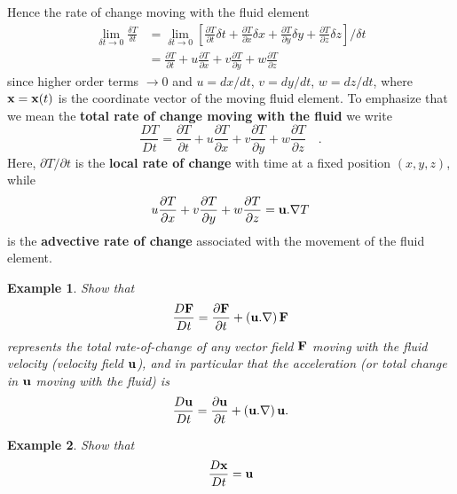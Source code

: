 \documentclass[twoside,a4paper,11pt]{report}
\newtheorem{exmp}{Example}}
\begin{document}
Hence the rate of change moving with the fluid element
\begin{align*}
\mathop {\lim }\limits_{\delta t\to 0} \frac{\delta T}{\delta 
t}
&=\mathop {\lim }\limits_{\delta t\to 0} \left[ {\frac{\partial 
T}{\partial t}\delta t+\frac{\partial T}{\partial x}\delta 
x+\frac{\partial T}{\partial y}\delta y+\frac{\partial 
T}{\partial z}\delta z} \right]/\delta t
\\
&
=\frac{\partial T}{\partial t}+u\frac{\partial T}{\partial 
x}+v\frac{\partial T}{\partial y}+w\frac{\partial 
T}{\partial z}
\end{align*}
since higher order terms $\to0$ and $u = dx/dt$, $v = dy/dt$, $w = dz/dt$, where 
${\bf x} = {\bf x}(t)$ is the coordinate vector of the 
moving fluid element. To emphasize that we mean the \textbf{total rate of 
change moving with the fluid} we write
\begin{equation}
\label{eq1}
\frac{DT}{Dt}=\frac{\partial T}{\partial t}+u\frac{\partial T}{\partial 
x}+v\frac{\partial T}{\partial y}+w\frac{\partial T}{\partial z}\quad .
\end{equation}
Here, $\partial T/\partial t$ is the \textbf{local rate of change} with 
time at a fixed position $(x,y,z)$, while 
\[
u\frac{\partial T}{\partial x}+v\frac{\partial T}{\partial 
y}+w\frac{\partial T}{\partial z}={\bf u}. \nabla T
\]
is the \textbf{advective rate of change} associated with the movement of the 
fluid element.

\begin{exmp}
Show that 
\[ \frac{D{{\bf F}}}{Dt}=\frac{\partial {{\bf F}}}{\partial 
t}+\left( {{{\bf u}}. \nabla } \right){{\bf F}}\]
represents the 
total rate-of-change of any vector field ${\bf F}$ moving with the fluid 
velocity (velocity field ${\bf u}$), and in particular that the 
acceleration (or total change in ${\bf u}$ moving with the fluid) is 
\[ \frac{D{{\bf u}}}{Dt}=\frac{\partial {{\bf u}}}{\partial t}+\left( 
{{{\bf u}}. \nabla } \right){{\bf u}}. \]

\end{exmp}

\begin{exmp}
Show that \[\frac{D{{\bf x}}}{Dt}={{\bf u}}\]

\end{exmp}
\end{document}
